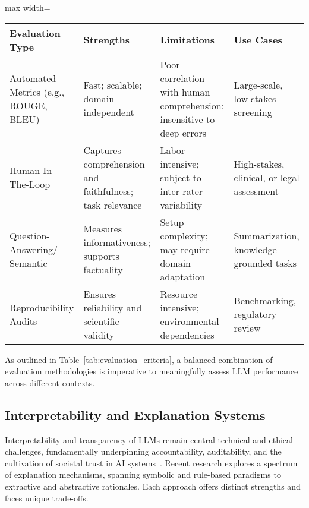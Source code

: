 \documentclass[sigconf]{acmart}
\begin{document}
\begin{table*}[htbp]
\centering
\caption{Comparison of Model Evaluation Approaches: Key Criteria}
\label{tab:evaluation_criteria}
\begin{adjustbox}{max width=\textwidth}
\begin{tabular}{@{}llll@{}}
\toprule
\textbf{Evaluation Type} & \textbf{Strengths} & \textbf{Limitations} & \textbf{Use Cases} \\
\midrule
Automated Metrics (e.g., ROUGE, BLEU) & Fast; scalable; domain-independent & Poor correlation with human comprehension; insensitive to deep errors & Large-scale, low-stakes screening \\
Human-In-The-Loop & Captures comprehension and faithfulness; task relevance & Labor-intensive; subject to inter-rater variability & High-stakes, clinical, or legal assessment \\
Question-Answering/ Semantic & Measures informativeness; supports factuality & Setup complexity; may require domain adaptation & Summarization, knowledge-grounded tasks \\
Reproducibility Audits & Ensures reliability and scientific validity & Resource intensive; environmental dependencies & Benchmarking, regulatory review \\
\bottomrule
\end{tabular}
\end{adjustbox}
\end{table*}

As outlined in Table~\ref{tab:evaluation_criteria}, a balanced combination of evaluation methodologies is imperative to meaningfully assess LLM performance across different contexts.

\subsection{Interpretability and Explanation Systems}

Interpretability and transparency of LLMs remain central technical and ethical challenges, fundamentally underpinning accountability, auditability, and the cultivation of societal trust in AI systems~\cite{ref1, ref2, ref3, ref10, ref14, ref18, ref19, ref35, ref36, ref41, ref43, ref45, ref46, ref49, ref52, ref73, ref83, ref84, ref85}. Recent research explores a spectrum of explanation mechanisms, spanning symbolic and rule-based paradigms to extractive and abstractive rationales. Each approach offers distinct strengths and faces unique trade-offs.
\end{document}
